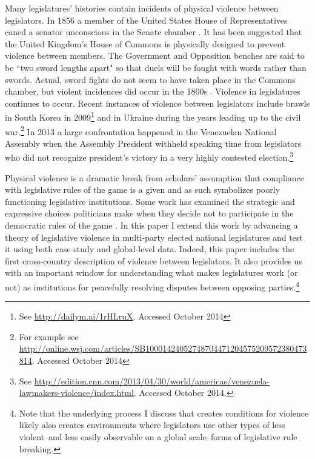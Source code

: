 \documentclass[a4paper]{article}\usepackage[]{graphicx}\usepackage[]{color}
\begin{document}
Many legislatures' histories contain incidents of physical violence between legislators. In 1856 a member of the United States House of Representatives caned a senator unconscious in the Senate chamber \citep{USSenateCanning}. It has been suggested that the United Kingdom's House of Commons is physically designed to prevent violence between members. The Government and Opposition benches are said to be ``two sword lengths apart" \citep{ParliamentUKSword} so that duels will be fought with words rather than swords. Actual, sword fights do not seem to have taken place in the Commons chamber, but violent incidences did occur in the 1800s \citep[see][]{ByrneViolence}. Violence in legislatures continues to occur. Recent instances of violence between legislators include brawls in South Korea in 2009\footnote{See \url{http://dailym.ai/1rHLruX}. Accessed October 2014} and in Ukraine during the years leading up to the civil war.\footnote{For example see \url{http://online.wsj.com/articles/SB10001424052748704471204575209572380473814}. Accessed October 2014} In 2013 a large confrontation happened in the Venezuelan National Assembly when the Assembly President withheld speaking time from legislators who did not recognize president's victory in a very highly contested election.\footnote{See \url{http://edition.cnn.com/2013/04/30/world/americas/venezuela-lawmakers-violence/index.html}. Accessed October 2014.}

Physical violence is a dramatic break from scholars' assumption that compliance with legislative rules of the game is a given and as such symbolizes poorly functioning legislative institutions. Some work has examined the strategic and expressive choices politicians make when they decide not to participate in the democratic rules of the game \citep{wilkinson2006,Beaulieu2008,BeaulieuForthcoming}. In this paper I extend this work by advancing a theory of legislative violence in multi-party elected national legislatures and test it using both case study and global-level data. Indeed, this paper includes the first cross-country description of violence between legislators. It also provides us with an important window for understanding what makes legislatures work (or not) as institutions for peacefully resolving disputes between opposing parties.\footnote{Note that the underlying process I discuss that creates conditions for violence likely also creates environments where legislators use other types of less violent--and less easily observable on a global scale--forms of legislative rule breaking.}
\end{document}
